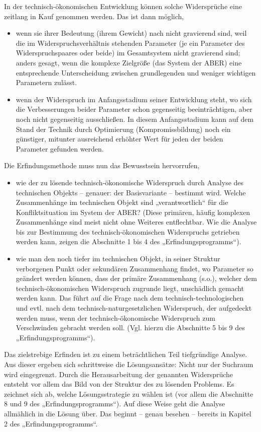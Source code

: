 \documentclass[12pt,a4paper]{article}
\begin{document}
In der technisch-ökonomischen Entwicklung können solche Widersprüche eine
zeitlang in Kauf genommen werden. Das ist dann möglich,
\begin{itemize}
\item wenn sie ihrer Bedeutung (ihrem Gewicht) nach nicht gravierend sind, weil
  die im Widerspruchsverhältnis stehenden Parameter (je ein Parameter des
  Widerspruchspaares oder beide) im Gesamtsystem nicht gravierend sind; anders
  gesagt, wenn die komplexe Zielgröße (das System der ABER) eine entsprechende
  Unterscheidung zwischen grundlegenden und weniger wichtigen Parametern
  zulässt.
\item wenn der Widerspruch im Anfangsstadium seiner Entwicklung steht, wo sich
  die Verbesserungen beider Parameter schon gegenseitig beeinträchtigen, aber
  noch nicht gegenseitig ausschließen. In diesem Anfangsstadium kann auf dem
  Stand der Technik durch Optimierung (Kompromissbildung) noch ein günstiger,
  mitunter ausreichend erhöhter Wert für jeden der beiden Parameter gefunden
  werden.
\end{itemize}
Die Erfindungsmethode muss nun das Bewusstsein hervorrufen,
\begin{itemize}
\item wie der zu lösende technisch-ökonomische Widerspruch durch Analyse des
  technischen Objekts – genauer: der Basisvariante – bestimmt wird. Welche
  Zusammenhänge im technischen Objekt sind „verantwortlich“ für die
  Konfliktsituation im System der ABER? (Diese primären, häufig komplexen
  Zusammenhänge sind meist nicht ohne Weiteres entflechtbar. Wie die Analyse
  bis zur Bestimmung des technisch-ökonomischen Widerspruchs getrieben werden
  kann, zeigen die Abschnitte 1 bis 4 des „Erfindungsprogramms“).
\item wie man den noch tiefer im technischen Objekt, in seiner Struktur
  verborgenen Punkt oder sekundären Zusammenhang findet, wo Parameter so
  geändert werden können, dass der primäre Zusammenhang (s.o.), welcher dem
  technisch-ökonomischen Widerspruch zugrunde liegt, unschädlich gemacht werden
  kann. Das führt auf die Frage nach dem technisch-technologischen und evtl.
  nach dem technisch-naturgesetzlichen Widerspruch, der aufgedeckt werden muss,
  wenn der technisch-ökonomische Widerspruch zum Verschwinden gebracht werden
  soll. (Vgl. hierzu die Abschnitte 5 bis 9 des „Erfindungsprogramms“).
\end{itemize}
Das zielstrebige Erfinden ist zu einem beträchtlichen Teil tiefgründige
Analyse. Aus dieser ergeben sich schrittweise die Lösungsansätze: Nicht nur der
Suchraum wird eingegrenzt. Durch die Herausarbeitung der genannten Widersprüche
entsteht vor allem das Bild von der Struktur des zu lösenden Problems. Es
zeichnet sich ab, welche Lösungsstrategie zu wählen ist (vor allem die
Abschnitte 8 und 9 des „Erfindungsprogramms“). Auf diese Weise geht die Analyse
allmählich in die Lösung über. Das beginnt – genau besehen – bereits in
Kapitel 2 des „Erfindungsprogramms“.
\end{document}
